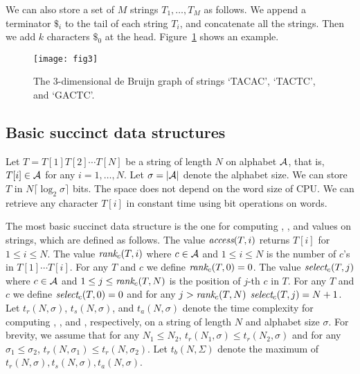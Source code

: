 We can also store a set of $M$ strings $T_1,\ldots,T_M$ as follows.
We append a terminator $\$_i$ to the tail of each string $T_i$,
and concatenate all the strings.  Then we add $k$ characters $\$_0$ at the head.
Figure~\ref{p1-fig:debruijn} shows an example.



\begin{figure}[bt]
\begin{center}
  \texttt{[image: fig3]}
\caption{The $3$-dimensional de Bruijn graph of strings `TACAC', `TACTC', and
`GACTC'.}
\label{p1-fig:debruijn}
\end{center}
\end{figure}

\subsection{Basic succinct data structures}\label{p1-sec:rank}

Let $T = T[1] T[2] \cdots T[N]$ be a string of length $N$ on alphabet ${\cal A}$, that is, $T[i] \in {\cal A}$ for any $i=1,\ldots,N$. Let $\sigma = |{\cal A}|$ denote the alphabet size. We can store $T$ in $N \lceil \log_2 \sigma \rceil$ bits.  The space does not depend on the word size of CPU.  We can retrieve any character $T[i]$ in constant time using bit operations on words.

The most basic succinct data structure is the one for computing {\rank}, {\select}, and {\access}
values on strings, which are defined as follows.
The value ${\textit{access}}(T,i)$ returns $T[i]$ for $1 \le i \le N$.
The value ${\textit{rank}}_c(T,i)$ where $c \in {\cal A}$ and $1 \le i \le N$
is the number of $c$'s in $T[1] \cdots T[i]$.  For any $T$ and $c$ we define
${\textit{rank}}_c(T,0) = 0$.
The value ${\textit{select}}_c(T,j)$ where $c \in {\cal A}$ and $1 \le j \le {\textit{rank}}_c(T,N)$
is the position of $j$-th $c$ in $T$.
For any $T$ and $c$ we define ${\textit{select}}_c(T,0) = 0$ and for any $j > {\textit{rank}}_c(T,N)$
${\textit{select}}_c(T,j) = N+1$.
Let $t_r(N,\sigma)$, $t_s(N,\sigma)$, and $t_a(N,\sigma)$ denote the time complexity for computing
{\rank}, {\select}, and {\access}, respectively, on a string of length $N$ and alphabet size $\sigma$.
For brevity, we assume that 
for any $N_1 \le N_2$, $t_r(N_1,\sigma) \le t_r(N_2,\sigma)$ and
for any $\sigma_1 \le \sigma_2$, $t_r(N,\sigma_1) \le t_r(N,\sigma_2)$.
Let $t_b(N,\Sigma)$ denote the maximum of 
$t_r(N,\sigma),t_s(N,\sigma),t_a(N,\sigma)$.

